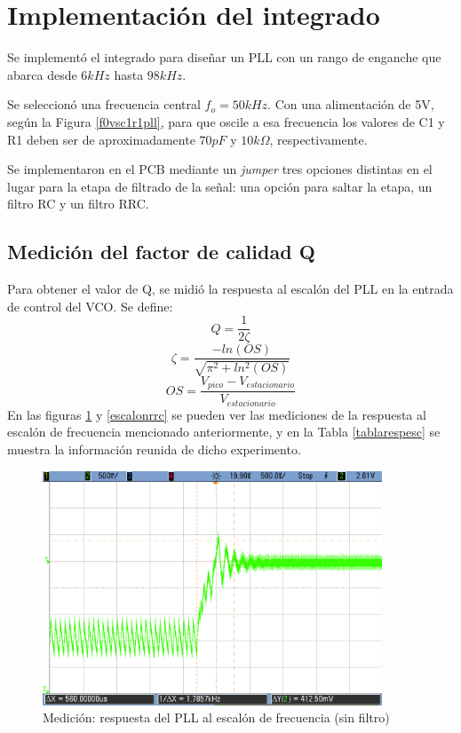 \documentclass{article}
\begin{document}
\section{Implementación del integrado}
Se implementó el integrado para diseñar un PLL con un rango de enganche que abarca desde $6kHz$ hasta $98kHz$.

Se seleccionó una frecuencia central $f_{o}=50kHz$. Con una alimentación de 5V, según la Figura \ref{f0vsc1r1pll}, para que oscile a esa frecuencia los valores de C1 y R1 deben ser de aproximadamente $70pF$ y $10k\Omega$, respectivamente.

Se implementaron en el PCB mediante un \emph{jumper} tres opciones distintas en el lugar para la etapa de filtrado de la señal: una opción para saltar la etapa, un filtro RC y un filtro RRC.

\subsection{Medición del factor de calidad Q}
Para obtener el valor de Q, se midió la respuesta al escalón del PLL en la entrada de control del VCO. Se define:
\begin{equation}
    Q=\frac{1}{2\zeta}
\end{equation}
\begin{equation}
    \zeta=\frac{-ln(OS)}{\sqrt{\pi^2+ln^2(OS)}}
\end{equation}
\begin{equation}
    OS=\frac{V_{pico}-V_{estacionario}}{V_{estacionario}}
\end{equation}
En las figuras \ref{escalonrc} y \ref{escalonrrc} se pueden ver las mediciones de la respuesta al escalón de frecuencia mencionado anteriormente, y en la Tabla \ref{tablarespesc} se muestra la información reunida de dicho experimento.
\begin{figure}[H]
    \centering
    \includegraphics[width=0.9\textwidth]{resources/escalonrc.png}
    \caption{Medición: respuesta del PLL al escalón de frecuencia (sin filtro)}
    \label{escalonrc}
\end{figure}
\end{document}
